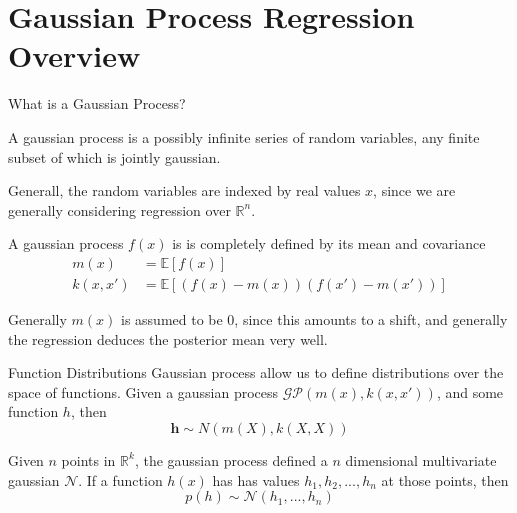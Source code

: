 \documentclass[10pt]{beamer}
\begin{document}
\section{Gaussian Process Regression Overview}
\label{sec:gauss-proc-regr}

\begin{frame}{What is a Gaussian Process?}
  \begin{definition}
    A gaussian process is a possibly infinite series of random variables, any finite subset of which is jointly gaussian.
  \end{definition}


  Generall, the random variables are indexed by real values $x$, since we are generally considering regression over $\mathbb{R}^{n}$.

  A gaussian process $f(x)$ is is completely defined by its mean and covariance
  \begin{equation}
    \begin{split}
      m(x) &= \mathbb{E} \left[ f(x) \right] \\
      k(x,x') &= \mathbb{E} \left[ \left( f(x) - m(x) \right)  \left( f(x') - m(x') \right)\right] 
    \end{split}
  \end{equation}

  \begin{alertenv}
    Generally $m(x)$ is assumed to be 0, since this amounts to a shift, and generally the regression deduces the posterior mean very well. 
  \end{alertenv}
  
\end{frame}

\begin{frame}{Function Distributions}
  Gaussian process allow us to define distributions over the space of functions. Given a gaussian process $\mathcal{GP} \left( m(x) , k(x,x') \right)$, and some function $h$, then
  \begin{equation}
    \mathbf{h} \sim N(m(X) , k(X,X))
  \end{equation}

Given $n$ points in $\mathbb{R}^{k}$, the gaussian process defined a $n$ dimensional multivariate gaussian $\mathcal{N}$. If a function $h(x)$ has has values $h_1,h_2,...,h_{n}$ at those points, then
\begin{equation}
  p \left( h \right) \sim \mathcal{N}(h_{1}, ..., h_{n})
\end{equation}
\end{frame}
\end{document}
